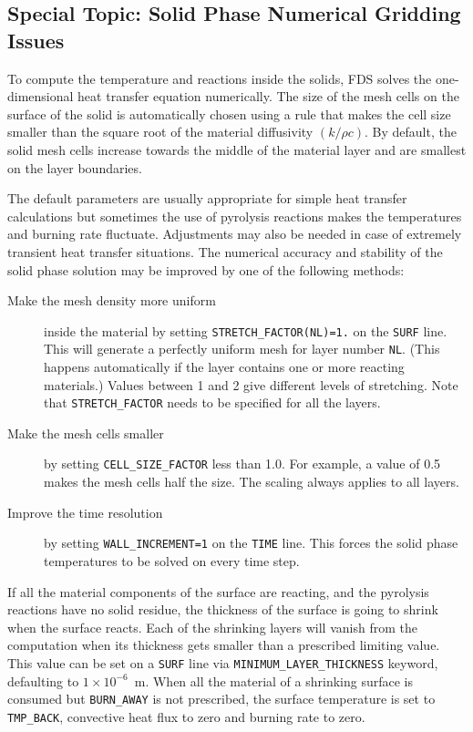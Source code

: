 \documentclass[11pt]{book}
\newcommand{\ct}{\tt\small}
\begin{document}
\subsection{Special Topic: Solid Phase Numerical Gridding Issues}
\label{info:solid_phase_stability}

To compute the temperature and reactions inside the solids, FDS solves
the one-dimensional heat transfer equation numerically. The size of
the mesh cells on the surface of the solid is automatically chosen
using a rule that makes the cell size smaller than the square root of
the material diffusivity $(k/\rho c)$. By default, the solid mesh
cells increase towards the middle of the material layer and are smallest
on the layer boundaries.

The default parameters are usually appropriate for simple heat transfer calculations but sometimes the use of pyrolysis reactions
makes the temperatures and burning rate fluctuate. Adjustments may also be needed in case of
extremely transient heat transfer situations. The numerical accuracy and stability of the solid phase solution may be improved by
one of the following methods:
\begin{description}
\item[Make the mesh density more uniform ] inside the material by setting {\ct STRETCH\_FACTOR(NL)=1.}
on the {\ct SURF} line. This will generate a perfectly uniform mesh for layer number {\ct NL}. (This happens automatically if the layer
contains one or more reacting materials.) Values between 1 and 2 give different levels of stretching.
Note that {\ct STRETCH\_FACTOR} needs to be specified for all the layers.
\item[Make the mesh cells smaller] by setting {\ct CELL\_SIZE\_FACTOR} less than 1.0. For example, a value of 0.5 makes the
mesh cells half the size. The scaling always applies to all layers.
\item[Improve the time resolution] by setting {\ct WALL\_INCREMENT=1} on the
{\ct TIME} line. This forces the solid phase temperatures to be solved on every time step.
\end{description}
If all the material components of the surface are reacting, and the pyrolysis reactions have no solid residue, the thickness of
the surface is going to shrink when the surface reacts. Each of the shrinking layers will vanish from the computation when its thickness gets
smaller than a prescribed limiting value. This value can be set on a {\ct SURF} line via {\ct MINIMUM\_LAYER\_THICKNESS} keyword,
defaulting to $1 \times 10^{-6}$~m. When all the material of a shrinking surface is consumed but {\ct BURN\_AWAY} is not
prescribed, the surface temperature is set to {\ct TMP\_BACK}, convective heat flux to zero and burning rate to zero.
\end{document}
